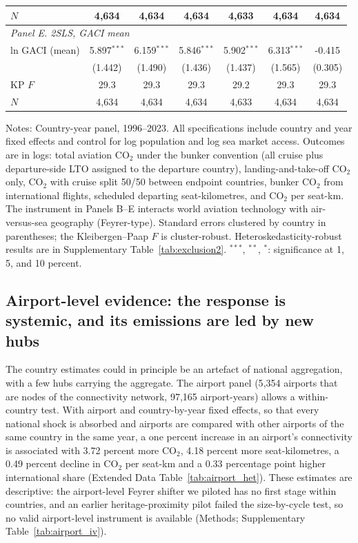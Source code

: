 \documentclass[12pt]{article}
\begin{document}
\begin{table}[htbp]
\begin{threeparttable}
\begin{tabular}{lcccccc}
  $N$ & 4,634 & 4,634 & 4,634 & 4,633 & 4,634 & 4,634 \\
\midrule
\multicolumn{7}{l}{\textit{Panel E. 2SLS, GACI mean}} \\
  ln GACI (mean) & 5.897$^{***}$ & 6.159$^{***}$ & 5.846$^{***}$ & 5.902$^{***}$ & 6.313$^{***}$ & -0.415 \\
   & (1.442) & (1.490) & (1.436) & (1.437) & (1.565) & (0.305) \\
  KP $F$ & 29.3 & 29.3 & 29.3 & 29.2 & 29.3 & 29.3 \\
  $N$ & 4,634 & 4,634 & 4,634 & 4,633 & 4,634 & 4,634 \\
\bottomrule
\end{tabular}
\begin{tablenotes}[flushleft]
\footnotesize
\item Notes: Country-year panel, 1996--2023. All specifications include country and year fixed effects and control for log population and log sea market access. Outcomes are in logs: total aviation CO$_2$ under the bunker convention (all cruise plus departure-side LTO assigned to the departure country), landing-and-take-off CO$_2$ only, CO$_2$ with cruise split 50/50 between endpoint countries, bunker CO$_2$ from international flights, scheduled departing seat-kilometres, and CO$_2$ per seat-km. The instrument in Panels B--E interacts world aviation technology with air-versus-sea geography (Feyrer-type). Standard errors clustered by country in parentheses; the Kleibergen--Paap $F$ is cluster-robust. Heteroskedasticity-robust results are in Supplementary Table~\ref{tab:exclusion2}. $^{***}$, $^{**}$, $^{*}$: significance at 1, 5, and 10 percent.
\end{tablenotes}
\end{threeparttable}
\end{table}

\subsection*{Airport-level evidence: the response is systemic, and its
emissions are led by new hubs}
The country estimates could in principle be an artefact of national
aggregation, with a few hubs carrying the aggregate. The airport panel
(5{,}354 airports that are nodes of the connectivity network, 97{,}165
airport-years) allows a within-country test. With airport and
country-by-year fixed effects, so that every national shock is absorbed and
airports are compared with other airports of the same country in the same
year, a one percent increase in an airport's connectivity is associated
with 3.72 percent more CO$_2$, 4.18 percent more seat-kilometres, a 0.49
percent decline in CO$_2$ per seat-km and a 0.33 percentage point higher
international share (Extended Data Table~\ref{tab:airport_het}). These
estimates are descriptive: the airport-level Feyrer shifter we piloted has
no first stage within countries, and an earlier heritage-proximity pilot
failed the size-by-cycle test, so no valid airport-level instrument is
available (Methods; Supplementary Table~\ref{tab:airport_iv}).
\end{document}
